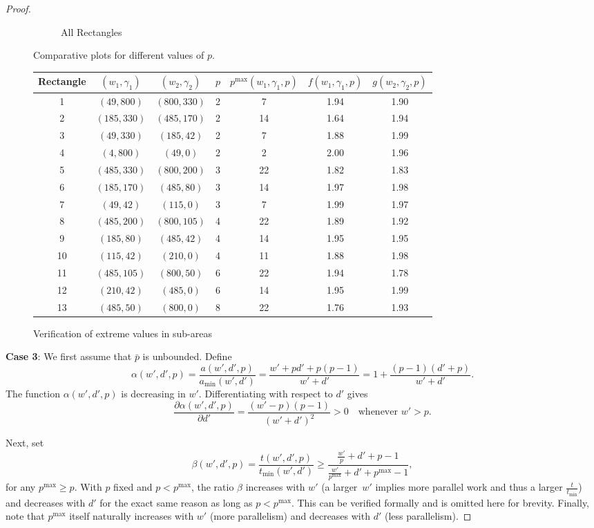 \documentclass{article}
\begin{document}
\begin{proof}
\begin{figure}[ht]
\begin{subfigure}{0.32\textwidth}
        \caption{All Rectangles}
    \end{subfigure}
    \caption{Comparative plots for different values of $p$.}
    \label{fig:all_plotsgen}
\end{figure}

\begin{figure}
\center
\begin{tabular}{|c|c|c|c|c|c|c|}
\hline
Rectangle & $(w_1,\gamma_1)$ & $(w_2,\gamma_2)$ & $p$ & $p^{\max}(w_1,\gamma_1,p) $& $f(w_1,\gamma_1,p)$ & $g(w_2,\gamma_2,p)$ \\
\hline
1 & $(49,800)$ & $(800,330)$ & 2 &7 & 1.94 & 1.90 \\
2 & $(185,330)$ & $(485,170)$ & 2 &14 & 1.64 & 1.94 \\
3 & $(49,330)$ & $(185,42)$ & 2 &7 & 1.88 & 1.99 \\
4 & $(4,800)$ & $(49,0)$ & 2 &2 & 2.00 & 1.96 \\
5 & $(485,330)$ & $(800,200)$ & 3 &22 & 1.82 & 1.83 \\
6 & $(185,170)$ & $(485,80)$ & 3 &14 & 1.97 & 1.98 \\
7 & $(49,42)$ & $(115,0)$ & 3 &7 & 1.99 & 1.97 \\
8 & $(485,200)$ & $(800,105)$ & 4 &22 & 1.89 & 1.92 \\
9 & $(185,80)$ & $(485,42)$ & 4 &14 & 1.95 & 1.95 \\
10 & $(115,42)$ & $(210,0)$ & 4 &11 & 1.88 & 1.98 \\
11 & $(485,105)$ & $(800,50)$ & 6 &22 & 1.94 & 1.78 \\
12 & $(210,42)$ & $(485,0)$ & 6 &14 & 1.95 & 1.99 \\
13 & $(485,50)$ & $(800,0)$ & 8 &22 & 1.76 & 1.93 \\
\hline
\end{tabular}
\caption{Verification of extreme values in sub-areas}
\label{fig.verif2}
\end{figure}
\textbf{Case 3}: We first assume that $\bar{p}$ is unbounded.  
Define
\[
\alpha(w',d',p)=\frac{a(w',d',p)}{a_{\min}(w',d')}
               =\frac{w'+pd'+p(p-1)}{w'+d'}
               =1+\frac{(p-1)(d'+p)}{w'+d'} .
\]
The function $\alpha(w',d',p)$ is decreasing in $w'$.  
Differentiating with respect to $d'$ gives
\[
\frac{\partial\alpha(w',d',p)}{\partial d'}
   =\frac{(w'-p)(p-1)}{(w'+d')^{2}}>0
   \quad\text{whenever } w'>p .
\]

Next, set
\[
\beta(w',d',p)=\frac{t(w',d',p)}{t_{\min}(w',d')}
             \ge\frac{\tfrac{w'}{p}+d'+p-1}{
                     \tfrac{w'}{p^{\max}}+d'+p^{\max}-1},
\]
for any $p^{\max}\ge p$.  
With $p$ fixed and $p<p^{\max}$, the ratio \(\beta\) increases with $w'$ (a
larger~$w'$ implies more parallel work and thus a larger
$\tfrac{t}{t_{\min}}$) and decreases with $d'$ for the exact same reason as long as $p<p^{\max}$.  
This can be verified formally and is omitted here for brevity.  
Finally, note that $p^{\max}$ itself naturally increases with $w'$ (more parallelism) and decreases with
$d'$ (less parallelism).


\end{proof}
\end{document}
